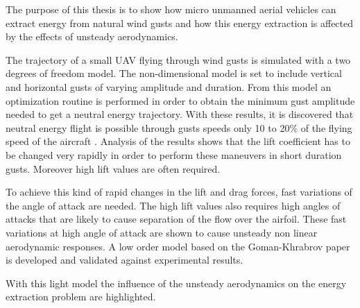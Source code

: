 \par The purpose of this thesis is to show how micro unmanned aerial vehicles can extract energy from natural wind gusts and how this energy extraction is affected by the effects of unsteady aerodynamics.

\par The trajectory of a small UAV flying through wind gusts is simulated with a two degrees of freedom model.
The non-dimensional model is set to include vertical and horizontal gusts of varying amplitude and duration.
From this model an optimization routine is performed in order to obtain the minimum gust amplitude needed to get a neutral energy trajectory.
With these results, it is discovered that neutral energy flight is possible through gusts speeds only 10 to 20\% of the flying speed of the aircraft .
Analysis of the results shows that the lift coefficient has to be changed very rapidly in order to perform these maneuvers in short duration gusts. 
Moreover high lift values are often required. 

\par To achieve this kind of rapid changes in the lift and drag forces, fast variations of the angle of attack are needed.
The high lift values also requires high angles of attacks that are likely to cause separation of the flow over the airfoil.
These fast variations at high angle of attack are shown to cause unsteady non linear aerodynamic responses.
A low order model based on the Goman-Khrabrov paper \cite{GK} is developed and validated against experimental results.

\par With this light model the influence of the unsteady aerodynamics on the energy extraction problem are highlighted.
